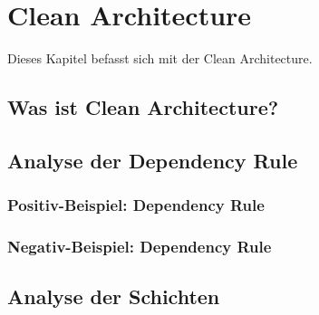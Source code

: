 \chapter{Clean Architecture}
Dieses Kapitel befasst sich mit der Clean Architecture.
\section{Was ist Clean Architecture?}

\section{Analyse der Dependency Rule}

\subsection{Positiv-Beispiel: Dependency Rule}

\subsection{Negativ-Beispiel: Dependency Rule}

\section{Analyse der Schichten}
